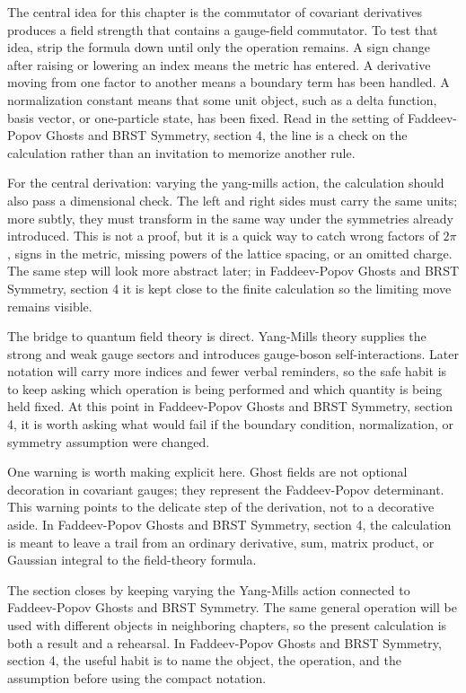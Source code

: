 The central idea for this chapter is the commutator of covariant derivatives produces a field strength that contains a gauge-field commutator.  To test that idea, strip the formula down until only the operation remains.  A sign change after raising or lowering an index means the metric has entered.  A derivative moving from one factor to another means a boundary term has been handled.  A normalization constant means that some unit object, such as a delta function, basis vector, or one-particle state, has been fixed.  Read in the setting of Faddeev-Popov Ghosts and BRST Symmetry, section 4, the line is a check on the calculation rather than an invitation to memorize another rule.

For the central derivation: varying the yang-mills action, the calculation should also pass a dimensional check.  The left and right sides must carry the same units; more subtly, they must transform in the same way under the symmetries already introduced.  This is not a proof, but it is a quick way to catch wrong factors of \(2\pi\), signs in the metric, missing powers of the lattice spacing, or an omitted charge.  The same step will look more abstract later; in Faddeev-Popov Ghosts and BRST Symmetry, section 4 it is kept close to the finite calculation so the limiting move remains visible.

The bridge to quantum field theory is direct.  Yang-Mills theory supplies the strong and weak gauge sectors and introduces gauge-boson self-interactions.  Later notation will carry more indices and fewer verbal reminders, so the safe habit is to keep asking which operation is being performed and which quantity is being held fixed.  At this point in Faddeev-Popov Ghosts and BRST Symmetry, section 4, it is worth asking what would fail if the boundary condition, normalization, or symmetry assumption were changed.

One warning is worth making explicit here.  Ghost fields are not optional decoration in covariant gauges; they represent the Faddeev-Popov determinant.  This warning points to the delicate step of the derivation, not to a decorative aside.  In Faddeev-Popov Ghosts and BRST Symmetry, section 4, the calculation is meant to leave a trail from an ordinary derivative, sum, matrix product, or Gaussian integral to the field-theory formula.

The section closes by keeping varying the Yang-Mills action connected to Faddeev-Popov Ghosts and BRST Symmetry.  The same general operation will be used with different objects in neighboring chapters, so the present calculation is both a result and a rehearsal.  In Faddeev-Popov Ghosts and BRST Symmetry, section 4, the useful habit is to name the object, the operation, and the assumption before using the compact notation.



